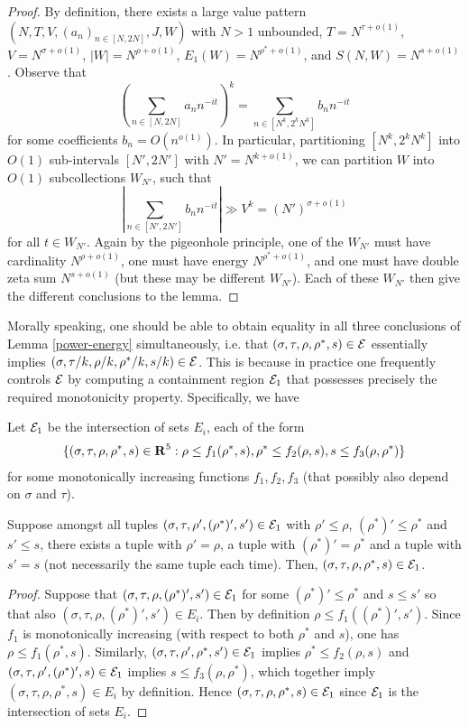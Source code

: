 \begin{proof} By definition, there exists a large value pattern $(N,T,V,(a_n)_{n \in [N,2N]},J,W)$ with $N > 1$ unbounded, $T = N^{\tau+o(1)}$, $V = N^{\sigma+o(1)}$, $|W| = N^{\rho+o(1)}$, $E_1(W) = N^{\rho^*+o(1)}$, and $S(N,W) = N^{s+o(1)}$.  Observe that
    $$ \left( \sum_{n \in [N,2N]} a_n n^{-it} \right)^k = \sum_{n \in [N^k, 2^k N^k]} b_n n^{-it}$$
for some coefficients $b_n = O(n^{o(1)})$.  In particular, partitioning $[N^k, 2^k N^k]$ into $O(1)$ sub-intervals $[N',2N']$ with $N' = N^{k+o(1)}$, we can partition $W$ into $O(1)$ subcollections $W_{N'}$, such that
$$ \left| \sum_{n \in [N',2N']} b_n n^{-it} \right| \gg V^k = (N')^{\sigma+o(1)}$$
for all $t \in W_{N'}$.  Again by the pigeonhole principle, one of the $W_{N'}$ must have cardinality $N^{\rho+o(1)}$, one must have energy $N^{\rho^*+o(1)}$, and one must have double zeta sum $N^{s+o(1)}$ (but these may be different $W_{N'}$).  Each of these $W_{N'}$ then give the different conclusions to the lemma.
\end{proof}

Morally speaking, one should be able to obtain equality in all three conclusions of Lemma \ref{power-energy} simultaneously, i.e. that $(\sigma,\tau,\rho,\rho^*,s) \in \mathcal{E}$ essentially implies $(\sigma,\tau/k,\rho/k,\rho^*/k,s/k) \in \mathcal{E}$. This is because in practice one frequently controls $\mathcal{E}$ by computing a containment region $\mathcal{E}_1$ that possesses precisely the required monotonicity property. Specifically, we have

\begin{lemma}\label{lver_e_mono_crit}
Let $\mathcal{E}_1$ be the intersection of sets $E_i$, each of the form
\begin{align*}
\{(\sigma, \tau, \rho, \rho^*, s) \in \mathbf{R}^5: \rho \le f_1(\rho^*, s), \rho^* \le f_2(\rho, s), s \le f_3(\rho, \rho^*)\}
\end{align*}
for some monotonically increasing functions $f_1, f_2, f_3$ (that possibly also depend on $\sigma$ and $\tau$).

Suppose amongst all tuples $(\sigma, \tau, \rho', (\rho^*)', s') \in \mathcal{E}_1$ with $\rho' \le \rho$, $(\rho^*)' \le \rho^*$ and $s' \le s$, there exists a tuple with $\rho' = \rho$, a tuple with $(\rho^*)' = \rho^*$ and a tuple with $s' = s$ (not necessarily the same tuple each time). Then, $(\sigma, \tau, \rho, \rho^*, s) \in \mathcal{E}_1$.
\end{lemma}
\begin{proof}
Suppose that $(\sigma, \tau, \rho, (\rho^*)', s') \in \mathcal{E}_1$ for some $(\rho^*)'\le \rho^*$ and $s \le s'$ so that also $(\sigma, \tau, \rho, (\rho^*)', s') \in E_i$. Then by definition $\rho \le f_1((\rho^*)', s')$. Since $f_1$ is monotonically increasing (with respect to both $\rho^*$ and $s$), one has $\rho \le f_1(\rho^*, s)$. Similarly, $(\sigma, \tau, \rho', \rho^*, s') \in \mathcal{E}_1$ implies $\rho^* \le f_2(\rho, s)$ and $(\sigma, \tau, \rho', (\rho^*)', s) \in \mathcal{E}_1$ implies $s \le f_3(\rho, \rho^*)$, which together imply $(\sigma, \tau, \rho, \rho^*, s) \in E_i$ by definition. Hence $(\sigma, \tau, \rho, \rho^*, s) \in \mathcal{E}_1$ since $\mathcal{E}_1$ is the intersection of sets $E_i$.
\end{proof}

